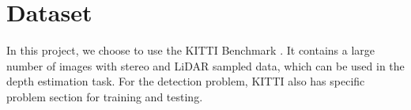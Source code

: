 \documentclass[a4paper]{article}
\begin{document}
\section{Dataset}
In this project, we choose to use the KITTI Benchmark \cite{Geiger2013IJRR}\cite{Fritsch2013ITSC}\cite{Menze2015CVPR}. It contains a large number of images with stereo and LiDAR sampled data, which can be used in the depth estimation task. For the detection problem, KITTI also has specific problem section for training and testing.



\end{document}
